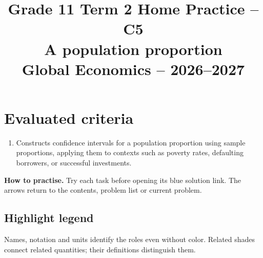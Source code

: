 \makeatletter
{}
\makeatother




\CoordinatedTermTwoPalette
\usepackage{needspace}
\usepackage{titling}
\setlength{\droptitle}{-2em}
\pretitle{\par\begingroup\centering\LARGE}
\posttitle{\par\endgroup}
\preauthor{}\postauthor{}
\predate{}\postdate{}
\maketitlehookd{\vspace{-1em}}
\linespread{1.12}
\setlength{\parskip}{5pt}

\title{Grade 11 Term 2 Home Practice -- C5\\\large A population proportion\\[0.25em]
	\normalsize Global Economics -- 2026--2027}
\author{}
\date{}


	\maketitle

	\setcounter{tocdepth}{1}
	\setcounter{secnumdepth}{2}
	\label{toc}
	\tableofcontents

	\section*{Evaluated criteria}
	\begin{enumerate}[label=\textbf{C\arabic*},start=5]
		\item Constructs confidence intervals for a population proportion using sample proportions, applying them to contexts such as poverty rates, defaulting borrowers, or successful investments.
	\end{enumerate}

	\textbf{How to practise.} Try each task before opening its blue solution link. The arrows return to the contents, problem list or current problem.


\subsection*{Highlight legend}
\label{tab:highlight-legend}
Names, notation and units identify the roles even without color. Related shades connect related quantities; their definitions distinguish them.

